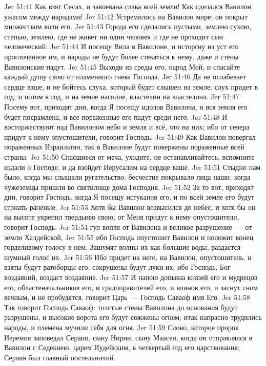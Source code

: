 \vs Jer 51:41 Как взят Сесах, и завоевана слава всей земли! Как сделался Вавилон ужасом между народами!
\vs Jer 51:42 Устремилось на Вавилон море; он покрыт множеством волн его.
\vs Jer 51:43 Города его сделались пустыми, землею сухою, степью, землею, где не живет ни один человек и где не проходит сын человеческий.
\vs Jer 51:44 И посещу Вила в Вавилоне, и исторгну из уст его проглоченное им, и народы не будут более стекаться к нему, даже и стены Вавилонские падут.
\vs Jer 51:45 Выходи из среды его, народ Мой, и спасайте каждый душу свою от пламенного гнева Господа.
\vs Jer 51:46 Да не ослабевает сердце ваше, и не бойтесь слуха, который будет слышен на земле; слух придет в  год, и потом в  год, и на земле  насилие, властелин  на властелина.
\vs Jer 51:47 Посему вот, приходят дни, когда Я посещу идолов Вавилона, и вся земля его будет посрамлена, и все пораженные его падут среди него.
\vs Jer 51:48 И восторжествуют над Вавилоном небо и земля и всё, что на них; ибо от севера придут к нему опустошители, говорит Господь.
\vs Jer 51:49 Как Вавилон повергал пораженных Израильтян, так в Вавилоне будут повержены пораженные всей страны.
\vs Jer 51:50 Спасшиеся от меча, уходите, не останавливайтесь, вспомните издали о Господе, и да взойдет Иерусалим на сердце ваше.
\vs Jer 51:51 Стыдно нам было, когда мы слышали ругательство: бесчестие покрывало лица наши, когда чужеземцы пришли во святилище дома Господня.
\vs Jer 51:52 За то вот, приходят дни, говорит Господь, когда Я посещу истуканов его, и по всей земле его будут стонать раненые.
\vs Jer 51:53 Хотя бы Вавилон возвысился до небес, и хотя бы он на высоте укрепил твердыню свою;  от Меня придут к нему опустошители, говорит Господь.
\vs Jer 51:54  гул вопля от Вавилона и великое разрушение~--- от земли Халдейской,
\vs Jer 51:55 ибо Господь опустошит Вавилон и положит конец горделивому голосу в нем. Зашумят волны их как большие воды, раздастся шумный голос их.
\vs Jer 51:56 Ибо придет на него, на Вавилон, опустошитель, и взяты будут ратоборцы его, сокрушены будут луки их; ибо Господь, Бог воздаяний, воздаст воздаяние.
\vs Jer 51:57 И напою допьяна князей его и мудрецов его, областеначальников его, и градоправителей его, и воинов его, и заснут сном вечным, и не пробудятся, говорит Царь~--- Господь Саваоф имя Его.
\vs Jer 51:58 Так говорит Господь Саваоф: толстые стены Вавилона до основания будут разрушены, и высокие ворота его будут сожжены огнем; итак напрасно трудились народы, и племена мучили себя для огня.
\rsbpar\vs Jer 51:59 Слово, которое пророк Иеремия заповедал Сераии, сыну Нирии, сыну Маасеи, когда он отправлялся в Вавилон с Седекиею, царем Иудейским, в четвертый год его царствования; Сераия был главный постельничий.
